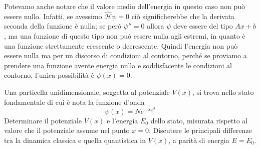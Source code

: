 \begin{soluzione}
   Potevamo anche notare che il valore medio dell'energia in questo caso non può essere nullo. Infatti, se avessimo $\hat{\mathcal{H}}\psi=0$ ciò significherebbe che la derivata seconda della funzione è nulla; se però $\psi''=0$ allora $\psi$ deve essere del tipo $Ax + b$, ma una funzione di questo tipo non può essere nulla agli estremi, in quanto è una funzione strettamente crescente o decrescente. Quindi l'energia non può essere nulla ma per un discorso di condizioni al contorno, perché se proviamo a prendere una funzione avente energia nulla e soddisfacente le condizioni al contorno, l'unica possibilità è $\psi(x)=0$.
\end{soluzione}

\newpage

\begin{esercizio}[(07/10/2020 n°3)]
   Una particella unidimensionale, soggetta al potenziale $V(x)$, si trova nello stato fondamentale di cui è nota la funzione d'onda
   \begin{equation*}
      \psi(x)=Ne^{-\lambda x^4}
   \end{equation*}
   Determinare il potenziale $V(x)$ e l'energia $E_0$ dello stato, misurata rispetto al valore che il potenziale assume nel punto $x=0$. Discutere le principali differenze tra la dinamica classica e quella quantistica in $V(x)$, a parità di energia $E=E_0$.
\end{esercizio}
